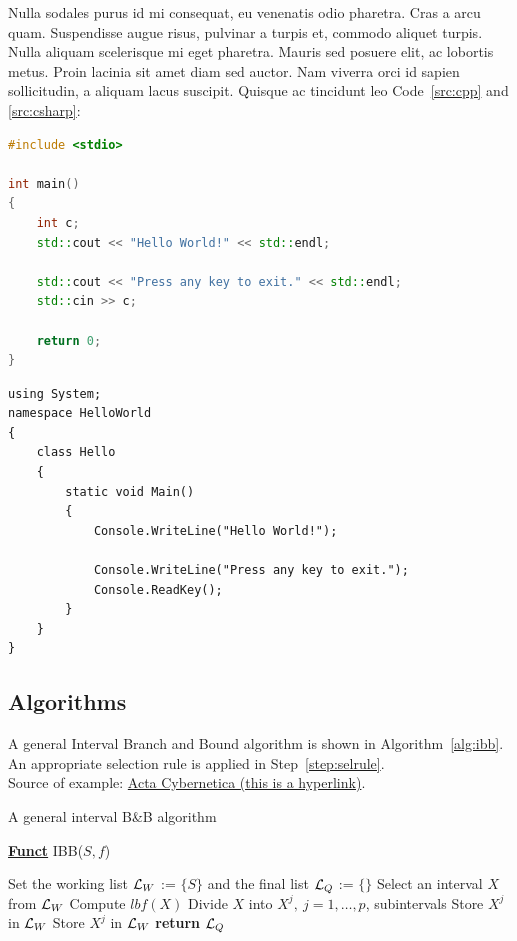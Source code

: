 Nulla sodales purus id mi consequat, eu venenatis odio pharetra. Cras a arcu quam. Suspendisse augue risus, pulvinar a turpis et, 
commodo aliquet turpis. Nulla aliquam scelerisque mi eget pharetra. Mauris sed posuere elit, ac lobortis metus. Proin lacinia sit
amet diam sed auctor. Nam viverra orci id sapien sollicitudin, a aliquam lacus suscipit. Quisque ac tincidunt leo Code~\ref{src:cpp}
and \ref{src:csharp}:

\begin{lstlisting}[language={C++}]
#include <stdio>

int main() 
{
	int c;
	std::cout << "Hello World!" << std::endl;

	std::cout << "Press any key to exit." << std::endl;
	std::cin >> c;
	
	return 0;
}
\end{lstlisting}

\begin{lstlisting}[language={[Sharp]C}]
using System;
namespace HelloWorld
{
	class Hello 
	{
		static void Main() 
		{
			Console.WriteLine("Hello World!");
			
			Console.WriteLine("Press any key to exit.");
			Console.ReadKey();
		}
	}
}
\end{lstlisting}

\subsection{Algorithms}

A general Interval Branch and Bound algorithm is shown in Algorithm~\ref{alg:ibb}. An appropriate selection rule is applied
in Step~\ref{step:selrule}.\\
Source of example: \href{http://www.inf.u-szeged.hu/actacybernetica/}{Acta Cybernetica (this is a hyperlink)}.

\begin{algorithm}[H]
\caption{A general interval B\&B algorithm} 
\label{alg:ibb} 
\textbf{\underline{Funct}} IBB($S,f$)
\begin{algorithmic}[1] %
\State Set the working list ${\cal L}_W$ := $\{S\}$ and the final list ${\cal L}_Q$ := $\{\}$     
 \label{alg:igoend}
	\State  Select an interval $X$ from ${\cal L}_W$ \label{step:selrule}  
	\State Compute $lbf(X)$ 		  
	 
		\State Divide $X$ into $X^j,\ j=1,\dots, p$, subintervals   
			 
				\State Store $X^j$ in ${\cal L}_W$ 
			\Else
				\State Store $X^j$ in ${\cal L}_W$ 
			\EndIf
		\EndFor  
	\EndIf
\EndWhile
\State \textbf{return} ${\cal L}_Q$
\end{algorithmic}
\end{algorithm}
\fi
